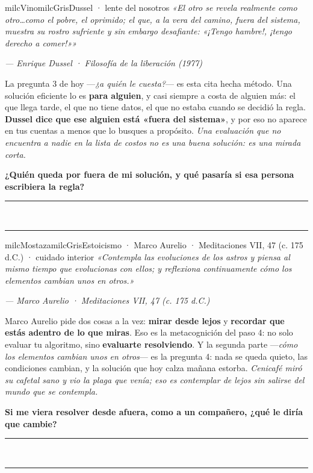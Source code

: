\documentclass[11pt,letterpaper]{article}
\newcommand{\linead}[1]{\noindent\color{milcLinea}\rule{#1}{0.5pt}\color{milcNegro}}
\begin{document}
\begin{softbox}{milcVino}{milcGris}{Dussel · lente del nosotros}
\textit{«El otro se revela realmente como otro\ldots como el pobre, el oprimido; el que, a la vera del camino, fuera del sistema, muestra su rostro sufriente y sin embargo desafiante: «¡Tengo hambre!, ¡tengo derecho a comer!»»}

{\footnotesize\itshape\color{milcNegro!70}--- Enrique Dussel · Filosofía de la liberación (1977)}

La pregunta 3 de hoy ---\emph{¿a quién le cuesta?}--- es esta cita hecha método. Una solución eficiente lo es \textbf{para alguien}, y casi siempre a costa de alguien más: el que llega tarde, el que no tiene datos, el que no estaba cuando se decidió la regla. \textbf{Dussel dice que ese alguien está «fuera del sistema»}, y por eso no aparece en tus cuentas a menos que lo busques a propósito. \emph{Una evaluación que no encuentra a nadie en la lista de costos no es una buena solución: es una mirada corta.}

\textbf{¿Quién queda por fuera de mi solución, y qué pasaría si esa persona escribiera la regla?}
\end{softbox}
\linead{\linewidth}\\[1mm]
\linead{\linewidth}

\begin{softbox}{milcMostaza}{milcGris}{Estoicismo · Marco Aurelio · Meditaciones VII, 47 (c. 175 d.C.) · cuidado interior}
\textit{«Contempla las evoluciones de los astros y piensa al mismo tiempo que evolucionas con ellos; y reflexiona continuamente cómo los elementos cambian unos en otros.»}

{\footnotesize\itshape\color{milcNegro!70}--- Marco Aurelio · Meditaciones VII, 47 (c. 175 d.C.)}

Marco Aurelio pide dos cosas a la vez: \textbf{mirar desde lejos} y \textbf{recordar que estás adentro de lo que miras}. Eso es la metacognición del paso 4: no solo evaluar tu algoritmo, sino \textbf{evaluarte resolviendo}. Y la segunda parte ---\emph{cómo los elementos cambian unos en otros}--- es la pregunta 4: nada se queda quieto, las condiciones cambian, y la solución que hoy calza mañana estorba. \emph{Cenicafé miró su cafetal sano y vio la plaga que venía; eso es contemplar de lejos sin salirse del mundo que se contempla.}

\textbf{Si me viera resolver desde afuera, como a un compañero, ¿qué le diría que cambie?}
\end{softbox}
\linead{\linewidth}\\[1mm]
\linead{\linewidth}
\end{document}
